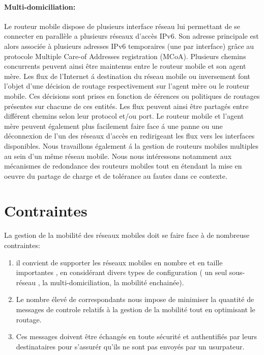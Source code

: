 \documentclass[12pt,a4paper]{report}
\begin{document}
\paragraph{Multi-domiciliation:} 
Le routeur mobile dispose de plusieurs interface r\'{e}seau lui permettant de se connecter en parall\`{e}le a plusieurs r\'{e}seaux d'acc\`{e}s IPv6. Son adresse principale est alors associ\'{e}e \`{a} plusieurs adresses IPv6 temporaires (une par interface) gr\^{a}ce au protocole Multiple Care-of Addresses registration (MCoA). Plusieurs chemins concurrents peuvent ainsi \^{e}tre maintenus entre le routeur mobile et son agent m\`{e}re.
Les flux de l'Internet \'{a} destination du r\'{e}seau mobile ou inversement font l'objet d'une d\'{e}cision de routage respectivement sur l'agent m\`{e}re ou le routeur mobile. Ces d\'{e}cisions sont prises en fonction de \'{e}\'{e}rences ou politiques de routages pr\'{e}sentes sur chacune de ces entit\'{e}s.
Les flux peuvent ainsi \^{e}tre partag\'{e}s entre diff\'{e}rent chemins selon leur protocol et/ou port. Le routeur mobile et l'agent m\`{e}re peuvent \'{e}galement plus facilement faire face \'{a} une panne ou une d\'{e}connexion de l'un des r\'{e}seaux d'acc\`{e}s en redirigeant les flux vers les interfaces disponibles.
Nous travaillons \'{e}galement \'{a} la gestion de routeurs mobiles multiples au sein d'un m\^{e}me r\'{e}seau mobile. Nous nous int\'{e}ressons notamment aux m\'{e}canismes de redondance des routeurs mobiles tout en \'{e}tendant la mise en oeuvre du partage de charge et de tol\'{e}rance au fautes dans ce contexte. \cite{ref3}

\newpage
\section{Contraintes}
La gestion de la mobilit\'e des r\'eseaux mobiles doit se faire face \`a de nombreuse contraintes:
\begin{enumerate}
  \item il convient de supporter les r\'eseaux mobiles en nombre et en taille importantes , en consid\'erant divers types de configuration ( un seul sous-r\'eseau , la multi-domiciliation, la mobilit\'e enchain\'ee).
  \item Le nombre \'elev\'e de correspondants nous impose de minimiser la quantit\'e de messages de controle relatifs \`a la gestion de la mobilit\'e tout en optimisant le routage.
  \item Ces messages doivent \^etre \'echang\'es en toute s\'ecurit\'e et authentifi\'es par leurs destinataires pour s'assur\'er qu'ils ne sont pas envoy\'es par un usurpateur. \cite{referance}
\end{enumerate}
\end{document}
